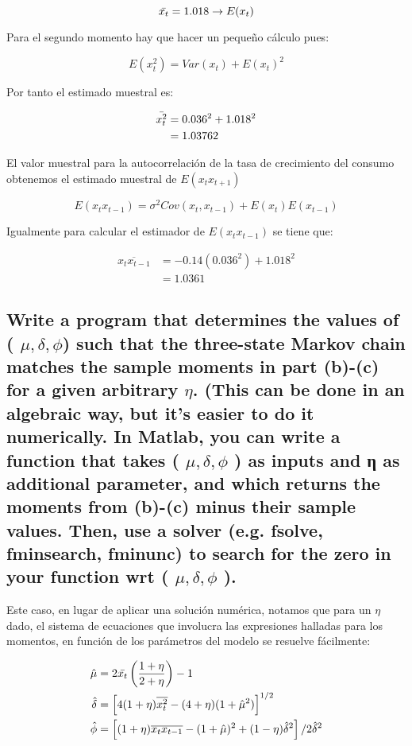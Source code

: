 \documentclass[12pt]{article}
\begin{document}
$$
\Bar{x_t} = 1.018 \rightarrow E(x_t)
$$

Para el segundo momento hay que hacer un pequeño cálculo pues:

$$
E(x_t^2) = Var(x_t)+E(x_t)^2
$$

Por tanto el estimado muestral es:

\begin{align*}
  \Bar{x_t^2} &= 0.036^2+1.018^2  \\
             &= 1.03762
\end{align*}

El valor muestral para la autocorrelación de la tasa de crecimiento del consumo obtenemos el estimado muestral de $E(x_t x_{t+1})$

$$
E(x_t x_{t-1}) = \sigma^2 Cov(x_t,x_{t-1}) + E(x_t)E(x_{t-1}) 
$$

Igualmente para calcular el estimador de $E(x_t x_{t-1})$ se tiene que:

\begin{align*}
    \overline{x_t x_{t-1}} &= -0.14(0.036^2) + 1.018^2 \\
                            &= 1.0361
\end{align*}

\subsection{Write a program that determines the values of ( $\mu,\delta,\phi $) such that the three-state Markov chain matches the sample moments in part (b)-(c) for a given arbitrary $\eta$. (This can be done in an algebraic way, but it’s easier to do it numerically. In Matlab, you can write a function that takes ( $\mu,\delta,\phi$ ) as inputs and η as additional parameter, and which returns the moments from (b)-(c) minus their sample values. Then, use a solver (e.g. fsolve, fminsearch, fminunc) to search for the zero in your function wrt ( $\mu,\delta,\phi$ ).}

Este caso, en lugar de aplicar una solución numérica, notamos que para un $\eta$ dado, el sistema de ecuaciones que involucra las expresiones halladas para los momentos, en función de los parámetros del modelo se resuelve fácilmente:

\begin{align*}
    \Hat{\mu} &= 2\Bar{x_t} \left ( \frac{1+\eta}{2+\eta} \right ) - 1\\ 
    \Hat{\delta} &= \left [ 4(1+\eta)\overline{x_t^2} - (4 + \eta)(1 + \Hat{\mu}^2)  \right ]^{1/2} \\
    \Hat{\phi} &= \left [ (1+\eta)\overline{x_t x_{t-1}} - (1 + \Hat{\mu})^2 + (1 - \eta)\Hat{\delta}^2  \right] / 2\Hat{\delta}^2
\end{align*}
\end{document}
